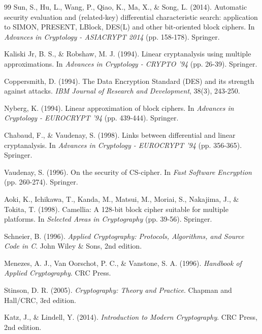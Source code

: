 \documentclass[12pt,a4paper]{article}
\theoremstyle{definition}
\begin{document}
\begin{thebibliography}{99}
Sun, S., Hu, L., Wang, P., Qiao, K., Ma, X., \& Song, L. (2014).
\newblock Automatic security evaluation and (related-key) differential characteristic search: application to SIMON, PRESENT, LBlock, DES(L) and other bit-oriented block ciphers.
\newblock In \textit{Advances in Cryptology - ASIACRYPT 2014} (pp. 158-178). Springer.

Kaliski Jr, B. S., \& Robshaw, M. J. (1994).
\newblock Linear cryptanalysis using multiple approximations.
\newblock In \textit{Advances in Cryptology - CRYPTO '94} (pp. 26-39). Springer.

Coppersmith, D. (1994).
\newblock The Data Encryption Standard (DES) and its strength against attacks.
\newblock \textit{IBM Journal of Research and Development}, 38(3), 243-250.

Nyberg, K. (1994).
\newblock Linear approximation of block ciphers.
\newblock In \textit{Advances in Cryptology - EUROCRYPT '94} (pp. 439-444). Springer.

Chabaud, F., \& Vaudenay, S. (1998).
\newblock Links between differential and linear cryptanalysis.
\newblock In \textit{Advances in Cryptology - EUROCRYPT '94} (pp. 356-365). Springer.

Vaudenay, S. (1996).
\newblock On the security of CS-cipher.
\newblock In \textit{Fast Software Encryption} (pp. 260-274). Springer.

Aoki, K., Ichikawa, T., Kanda, M., Matsui, M., Moriai, S., Nakajima, J., \& Tokita, T. (1998).
\newblock Camellia: A 128-bit block cipher suitable for multiple platforms.
\newblock In \textit{Selected Areas in Cryptography} (pp. 39-56). Springer.

Schneier, B. (1996).
\newblock \textit{Applied Cryptography: Protocols, Algorithms, and Source Code in C}.
\newblock John Wiley \& Sons, 2nd edition.

Menezes, A. J., Van Oorschot, P. C., \& Vanstone, S. A. (1996).
\newblock \textit{Handbook of Applied Cryptography}.
\newblock CRC Press.

Stinson, D. R. (2005).
\newblock \textit{Cryptography: Theory and Practice}.
\newblock Chapman and Hall/CRC, 3rd edition.

Katz, J., \& Lindell, Y. (2014).
\newblock \textit{Introduction to Modern Cryptography}.
\newblock CRC Press, 2nd edition.


\end{thebibliography}
\end{document}
